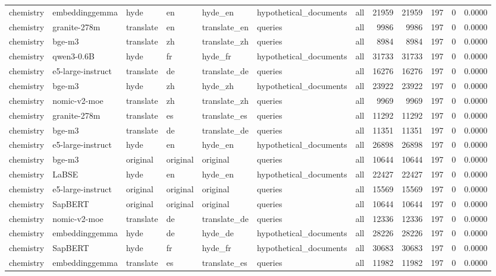 \begin{tabular}{lllllllrrrrr}
chemistry & embeddinggemma & hyde & en & hyde\_en & hypothetical\_documents & all & 21959 & 21959 & 197 & 0 & 0.0000 \\
chemistry & granite-278m & translate & en & translate\_en & queries & all & 9986 & 9986 & 197 & 0 & 0.0000 \\
chemistry & bge-m3 & translate & zh & translate\_zh & queries & all & 8984 & 8984 & 197 & 0 & 0.0000 \\
chemistry & qwen3-0.6B & hyde & fr & hyde\_fr & hypothetical\_documents & all & 31733 & 31733 & 197 & 0 & 0.0000 \\
chemistry & e5-large-instruct & translate & de & translate\_de & queries & all & 16276 & 16276 & 197 & 0 & 0.0000 \\
chemistry & bge-m3 & hyde & zh & hyde\_zh & hypothetical\_documents & all & 23922 & 23922 & 197 & 0 & 0.0000 \\
chemistry & nomic-v2-moe & translate & zh & translate\_zh & queries & all & 9969 & 9969 & 197 & 0 & 0.0000 \\
chemistry & granite-278m & translate & es & translate\_es & queries & all & 11292 & 11292 & 197 & 0 & 0.0000 \\
chemistry & bge-m3 & translate & de & translate\_de & queries & all & 11351 & 11351 & 197 & 0 & 0.0000 \\
chemistry & e5-large-instruct & hyde & en & hyde\_en & hypothetical\_documents & all & 26898 & 26898 & 197 & 0 & 0.0000 \\
chemistry & bge-m3 & original & original & original & queries & all & 10644 & 10644 & 197 & 0 & 0.0000 \\
chemistry & LaBSE & hyde & en & hyde\_en & hypothetical\_documents & all & 22427 & 22427 & 197 & 0 & 0.0000 \\
chemistry & e5-large-instruct & original & original & original & queries & all & 15569 & 15569 & 197 & 0 & 0.0000 \\
chemistry & SapBERT & original & original & original & queries & all & 10644 & 10644 & 197 & 0 & 0.0000 \\
chemistry & nomic-v2-moe & translate & de & translate\_de & queries & all & 12336 & 12336 & 197 & 0 & 0.0000 \\
chemistry & embeddinggemma & hyde & de & hyde\_de & hypothetical\_documents & all & 28226 & 28226 & 197 & 0 & 0.0000 \\
chemistry & SapBERT & hyde & fr & hyde\_fr & hypothetical\_documents & all & 30683 & 30683 & 197 & 0 & 0.0000 \\
chemistry & embeddinggemma & translate & es & translate\_es & queries & all & 11982 & 11982 & 197 & 0 & 0.0000 \\

\end{tabular}
